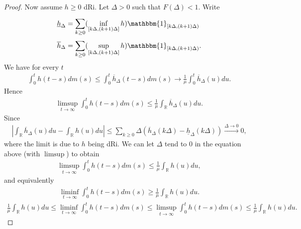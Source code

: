 \begin{proof}
Now assume $h\geq 0$ dRi. Let $\Delta>0$ such that $F(\Delta)<1$. Write
\begin{align}
	\underline{h}_{\Delta} &= \sum_{k\geq 0}^{} (\inf_{[k\Delta, (k+1)\Delta]}h) \mathbbm{1}_{[k\Delta, (k+1)\Delta)} \\
	\overline{h}_{\Delta} &=  \sum_{k\geq 0}^{} (\sup_{[k\Delta, (k+1)\Delta]}h) \mathbbm{1}_{[k\Delta, (k+1)\Delta)}. 
\end{align}
We have for every $t$ 
\begin{align}
	\int_{0}^{t} h(t-s)dm(s) \leq \int_{0}^{t} \overline{h}_{\Delta}(t-s) dm(s) \to  \frac{1}{\mu }\int_{0}^{t} \overline{h}_{\Delta}(u)du.
\end{align}
Hence
\begin{align}
	\limsup_{t\to\infty} \int_{0}^{t} h(t-s)dm(s) \leq \frac{1}{\mu }\int_{\mathbb{R}}^{} \overline{h}_{\Delta}(u)du.
\end{align}
Since
\begin{align}
	\left| \int_{\mathbb{R}}^{} \overline{h}_{\Delta}(u) du - \int_{\mathbb{R}}^{} h(u) du \right| \leq \sum_{k\geq 0}^{} \Delta \left(\overline{h}_{\Delta}(k\Delta) - \underline{h}_{\Delta}(k\Delta)\right) \stackrel{\Delta\to0}{\longrightarrow} 0,
\end{align}
where the limit is due to $h$ being dRi. We can let $\Delta$ tend to 0 in the equation above {\color{blue}(with $\limsup$)} to obtain
\begin{align}
	\limsup_{t\to\infty} \int_{0}^{t} h(t-s)dm(s) \leq \frac{1}{\mu }\int_{\mathbb{R}}^{} h(u)du,
\end{align}
and equivalently
\begin{align}
	\liminf_{t\to\infty} \int_{0}^{t} h(t-s)dm(s) \geq \frac{1}{\mu }\int_{\mathbb{R}}^{} h(u)du.
\end{align}
{\color{blue}
\begin{align}
	\frac{1}{\mu }\int_{\mathbb{R}}^{} h(u)du \leq \liminf_{t\to\infty} \int_{0}^{t} h(t-s)dm(s) 
	\leq
	\limsup_{t\to\infty} \int_{0}^{t} h(t-s)dm(s) \leq \frac{1}{\mu }\int_{\mathbb{R}}^{} h(u)du.
\end{align}
}
\end{proof}

